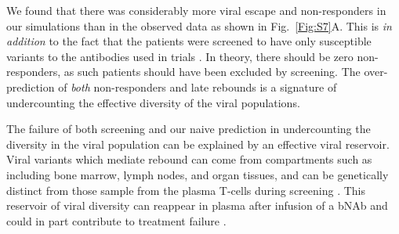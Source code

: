 \documentclass[11pt]{article}
\begin{document}
We found that there was considerably more viral escape and non-responders in our simulations than in the observed data as shown in Fig.~\ref{Fig:S7}A.
This is {\em in addition} to the fact that the patients were screened to have only susceptible variants to the antibodies used in trials \cite{Caskey:2015hm,Caskey:2017el,bar-onSafetyAntiviralActivity2018}. In theory, there should be zero non-responders, as such patients should have been excluded by screening. The over-prediction of {\em both} non-responders and late rebounds is a signature of undercounting the effective diversity of the viral populations.

The failure of both screening and our naive prediction in undercounting the diversity in the viral population can be explained by an effective viral reservoir.
Viral variants which mediate rebound can come from compartments such as including bone marrow, lymph nodes, and organ tissues, and can be genetically distinct from those sample from the plasma T-cells during screening \cite{chaillonHIVPersistsThroughout2020a,wongTissueReservoirsHIV2016,chunHIVinfectedIndividualsReceiving2005}.
This reservoir of viral diversity can reappear in plasma after infusion of a bNAb and could  in part contribute to  treatment failure \cite{avettand-fenoelFailureBoneMarrow2007, shanReactivationLatentHIV12013, sharkeyEpisomalViralCDNAs2011, tagarroEarlyHighlySuppressive2018}. \\
\end{document}
